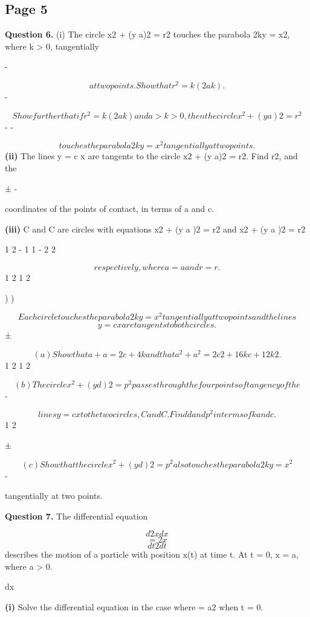 \documentclass[12pt]{article}
\begin{document}
\subsection*{Page 5}
\begin{flushleft}
\bigskip\textbf{Question 6.} (i) The circle x2 + (y a)2 = r2 touches the parabola 2ky = x2, where k > 0, tangentially\par
-\par
\[at two points. Show that r^2 = k(2a k).\]
-\par
\[Show further that if r^2 = k(2a k) and a > k > 0, then the circle x^2 + (y a)2 = r^2\]
- -\par
\[touches the parabola 2ky = x^2 tangentially at two points.\]
\textbf{(ii)} The lines y = c x are tangents to the circle x2 + (y a)2 = r2. Find r2, and the\par
± -\par
coordinates of the points of contact, in terms of a and c.\par
\textbf{(iii)} C and C are circles with equations x2 + (y a )2 = r2 and x2 + (y a )2 = r2\par
1 2 - 1 1 - 2 2\par
\[respectively, where a = a and r = r .\]
1 2 1 2\par
) )\par
\[Each circle touches the parabola 2ky = x^2 tangentially at two points and the lines\]
\[y = c x are tangents to both circles.\]
±\par
\[(a) Show that a + a = 2c + 4k and that a^2 + a^2 = 2c2 + 16kc + 12k2.\]
1 2 1 2\par
\[(b) The circle x^2 + (y d)2 = p^2 passes through the four points of tangency of the\]
-\par
\[lines y = c x to the two circles, C and C . Find d and p^2 in terms of k and c.\]
1 2\par
±\par
\[(c) Show that the circle x^2 + (y d)2 = p^2 also touches the parabola 2ky = x^2\]
-\par
tangentially at two points.\par
\bigskip\textbf{Question 7.} The differential equation\par
\[d2x dx\]
\[= 2x\]
\[dt2 dt\]
describes the motion of a particle with position x(t) at time t. At t = 0, x = a, where a > 0.\par
dx\par
\textbf{(i)} Solve the differential equation in the case where = a2 when t = 0.\par

\end{flushleft}
\end{document}
